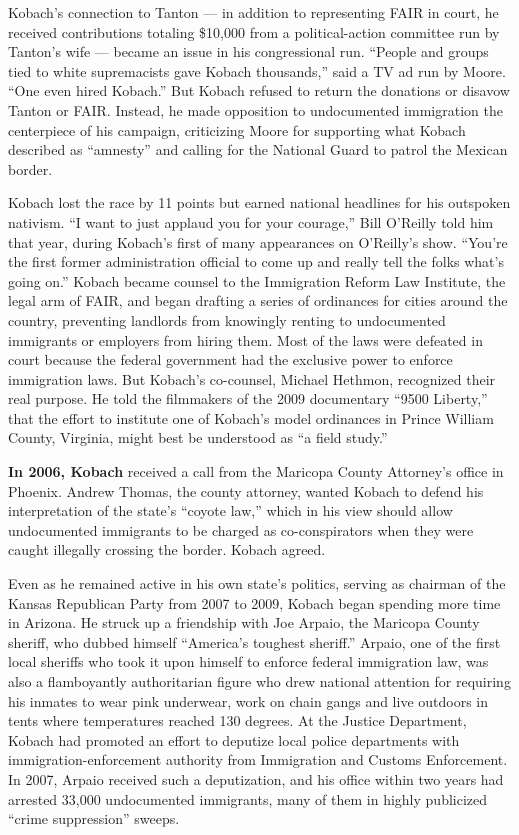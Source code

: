 Kobach's connection to Tanton --- in addition to representing FAIR in
court, he received contributions totaling \$10,000 from a
political-action committee run by Tanton's wife --- became an issue in
his congressional run. ``People and groups tied to white supremacists
gave Kobach thousands,'' said a TV ad run by Moore. ``One even hired
Kobach.'' But Kobach refused to return the donations or disavow Tanton
or FAIR. Instead, he made opposition to undocumented immigration the
centerpiece of his campaign, criticizing Moore for supporting what
Kobach described as ``amnesty'' and calling for the National Guard to
patrol the Mexican border.

Kobach lost the race by 11 points but earned national headlines for his
outspoken nativism. ``I want to just applaud you for your courage,''
Bill O'Reilly told him that year, during Kobach's first of many
appearances on O'Reilly's show. ``You're the first former administration
official to come up and really tell the folks what's going on.'' Kobach
became counsel to the Immigration Reform Law Institute, the legal arm of
FAIR, and began drafting a series of ordinances for cities around the
country, preventing landlords from knowingly renting to undocumented
immigrants or employers from hiring them. Most of the laws were defeated
in court because the federal government had the exclusive power to
enforce immigration laws. But Kobach's co-counsel, Michael Hethmon,
recognized their real purpose. He told the filmmakers of the 2009
documentary ``9500 Liberty,'' that the effort to institute one of
Kobach's model ordinances in Prince William County, Virginia, might best
be understood as ``a field study.''

\textbf{In 2006, Kobach} received a call from the Maricopa County
Attorney's office in Phoenix. Andrew Thomas, the county attorney, wanted
Kobach to defend his interpretation of the state's ``coyote law,'' which
in his view should allow undocumented immigrants to be charged as
co-conspirators when they were caught illegally crossing the border.
Kobach agreed.

Even as he remained active in his own state's politics, serving as
chairman of the Kansas Republican Party from 2007 to 2009, Kobach began
spending more time in Arizona. He struck up a friendship with Joe
Arpaio, the Maricopa County sheriff, who dubbed himself ``America's
toughest sheriff.'' Arpaio, one of the first local sheriffs who took it
upon himself to enforce federal immigration law, was also a flamboyantly
authoritarian figure who drew national attention for requiring his
inmates to wear pink underwear, work on chain gangs and live outdoors in
tents where temperatures reached 130 degrees. At the Justice Department,
Kobach had promoted an effort to deputize local police departments with
immigration-enforcement authority from Immigration and Customs
Enforcement. In 2007, Arpaio received such a deputization, and his
office within two years had arrested 33,000 undocumented immigrants,
many of them in highly publicized ``crime suppression'' sweeps.

